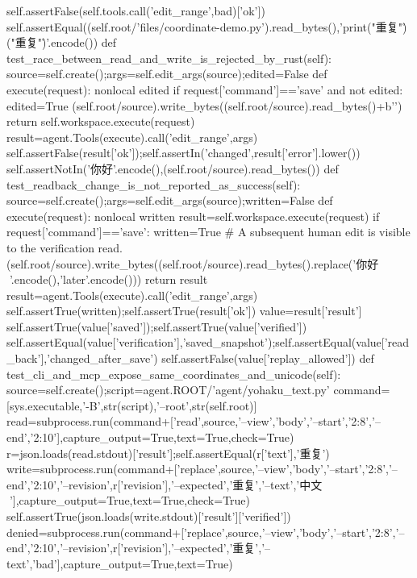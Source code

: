             self.assertFalse(self.tools.call('edit_range',bad)['ok'])
        self.assertEqual((self.root/'files/coordinate-demo.py').read_bytes(),'print("重复")\r\nprint("重复")\r\n'.encode())
    def test_race_between_read_and_write_is_rejected_by_rust(self):
        source=self.create();args=self.edit_args(source);edited=False
        def execute(request):
            nonlocal edited
            if request['command']=='save' and not edited:
                edited=True
                (self.root/source).write_bytes((self.root/source).read_bytes()+b'\n')
            return self.workspace.execute(request)
        result=agent.Tools(execute).call('edit_range',args)
        self.assertFalse(result['ok']);self.assertIn('changed',result['error'].lower())
        self.assertNotIn('你好'.encode(),(self.root/source).read_bytes())
    def test_readback_change_is_not_reported_as_success(self):
        source=self.create();args=self.edit_args(source);written=False
        def execute(request):
            nonlocal written
            result=self.workspace.execute(request)
            if request['command']=='save':
                written=True
                # A subsequent human edit is visible to the verification read.
                (self.root/source).write_bytes((self.root/source).read_bytes().replace('你好🧸'.encode(),'later'.encode()))
            return result
        result=agent.Tools(execute).call('edit_range',args)
        self.assertTrue(written);self.assertTrue(result['ok'])
        value=result['result']
        self.assertTrue(value['saved']);self.assertTrue(value['verified'])
        self.assertEqual(value['verification'],'saved_snapshot');self.assertEqual(value['read_back'],'changed_after_save')
        self.assertFalse(value['replay_allowed'])
    def test_cli_and_mcp_expose_same_coordinates_and_unicode(self):
        source=self.create();script=agent.ROOT/'agent/yohaku_text.py'
        command=[sys.executable,'-B',str(script),'--root',str(self.root)]
        read=subprocess.run(command+['read',source,'--view','body','--start','2:8','--end','2:10'],capture_output=True,text=True,check=True)
        r=json.loads(read.stdout)['result'];self.assertEqual(r['text'],'重复')
        write=subprocess.run(command+['replace',source,'--view','body','--start','2:8','--end','2:10','--revision',r['revision'],'--expected','重复','--text','中文🧸'],capture_output=True,text=True,check=True)
        self.assertTrue(json.loads(write.stdout)['result']['verified'])
        denied=subprocess.run(command+['replace',source,'--view','body','--start','2:8','--end','2:10','--revision',r['revision'],'--expected','重复','--text','bad'],capture_output=True,text=True)

